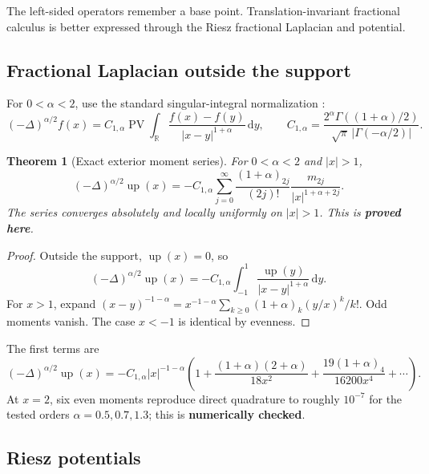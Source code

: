 \documentclass[11pt]{article}
\newcommand{\statusproved}{\textcolor{statusgreen}{\textbf{proved here}}}
\newcommand{\statusnumeric}{\textcolor{statusorange}{\textbf{numerically checked}}}
\newtheorem{theorem}{Theorem}[section]
\theoremstyle{definition}
\theoremstyle{remark}
\newcommand{\R}{\mathbb R}
\newcommand{\dd}{\,\mathrm d}
\newcommand{\Up}{\operatorname{up}}
\newcommand{\poch}[2]{(#1)_{#2}}
\DeclareMathOperator{\PV}{PV}
\begin{document}
The left-sided operators remember a base point.  Translation-invariant fractional calculus is
better expressed through the Riesz fractional Laplacian and potential.

\subsection{Fractional Laplacian outside the support}

For $0<\alpha<2$, use the standard singular-integral normalization
\cite{kwasnicki2017}:
\begin{equation}
 (-\Delta)^{\alpha/2}f(x)
 =C_{1,\alpha}\PV\int_{\R}\frac{f(x)-f(y)}{|x-y|^{1+\alpha}}\dd y,
 \qquad
 C_{1,\alpha}=
 \frac{2^\alpha\Gamma((1+\alpha)/2)}{\sqrt\pi\,|\Gamma(-\alpha/2)|}.
 \label{eq:fractional-Laplacian-def}
\end{equation}

\begin{theorem}[Exact exterior moment series]
\label{thm:fractional-Laplacian-tail}
For $0<\alpha<2$ and $|x|>1$,
\begin{equation}
 \boxed{
 (-\Delta)^{\alpha/2}\Up(x)
 =-C_{1,\alpha}\sum_{j=0}^{\infty}
 \frac{\poch{1+\alpha}{2j}}{(2j)!}
 \frac{m_{2j}}{|x|^{1+\alpha+2j}}.}
 \label{eq:fractional-Laplacian-tail}
\end{equation}
The series converges absolutely and locally uniformly on $|x|>1$.  This is \statusproved.
\end{theorem}

\begin{proof}
Outside the support, $\Up(x)=0$, so
\[
 (-\Delta)^{\alpha/2}\Up(x)
 =-C_{1,\alpha}\int_{-1}^{1}\frac{\Up(y)}{|x-y|^{1+\alpha}}\dd y.
\]
For $x>1$, expand
$(x-y)^{-1-\alpha}=x^{-1-\alpha}\sum_{k\ge0}\poch{1+\alpha}{k}(y/x)^k/k!$.
Odd moments vanish.  The case $x<-1$ is identical by evenness.
\end{proof}

The first terms are
\begin{equation}
 (-\Delta)^{\alpha/2}\Up(x)
 =-C_{1,\alpha}|x|^{-1-\alpha}
 \left(1+\frac{(1+\alpha)(2+\alpha)}{18x^2}
 +\frac{19(1+\alpha)_4}{16200x^4}+\cdots\right).
 \label{eq:fractional-Laplacian-first-terms}
\end{equation}
At $x=2$, six even moments reproduce direct quadrature to roughly $10^{-7}$ for the tested
orders $\alpha=0.5,0.7,1.3$; this is \statusnumeric.

\subsection{Riesz potentials}
\end{document}
